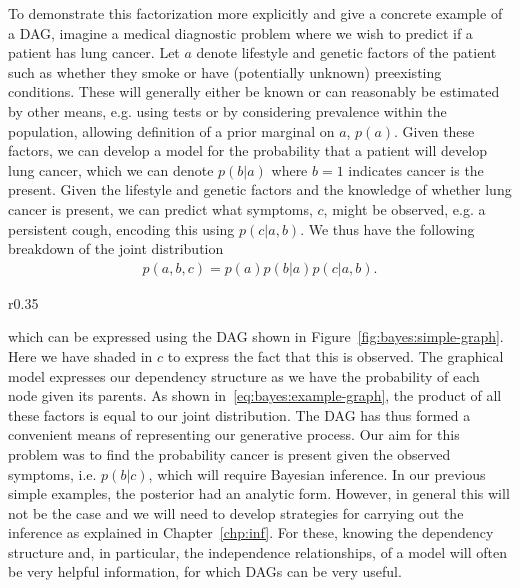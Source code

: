 To demonstrate this factorization more explicitly and give a concrete example of a DAG, 
imagine a medical diagnostic problem where we wish to predict if a patient has lung cancer.
Let $a$ denote lifestyle and genetic factors of the patient such as whether they smoke
or have (potentially unknown) preexisting conditions. 
These will generally either be known or can reasonably be estimated by other means, e.g. using 
tests or
by considering prevalence within the population, allowing definition of a prior marginal on $a$, $p(a)$.
Given these factors, we can develop a model for the probability that a patient will develop
lung cancer, which we can denote $p(b|a)$ where $b=1$ indicates cancer is the present.  Given the lifestyle and
genetic factors and the knowledge of whether lung cancer is present, we can predict what
symptoms, $c$, might be observed, e.g. a persistent cough, encoding this using $p(c|a,b)$.
We thus have the following breakdown of the joint distribution
\begin{align}
	\label{eq:bayes:example-graph}
	p(a,b,c) = p(a) p(b|a) p(c|a,b).
\end{align}
\begin{wrapfigure}{r}{0.35\textwidth}
	\vspace{-12pt}
	\centering 
	\resizebox{.32\textwidth}{!}{
		
	}
	\caption{Simple example DAG corresponding to~\eqref{eq:bayes:example-graph}
		\label{fig:bayes:simple-graph}}
	\vspace{-10pt}
\end{wrapfigure}
which can be expressed using
the DAG  shown in Figure~\ref{fig:bayes:simple-graph}. Here we have shaded in $c$ to express the fact that this is
observed.  The graphical model expresses our dependency structure as we have the probability
of each node given its parents.  As shown in~\eqref{eq:bayes:example-graph}, the product of
all these factors is equal to our joint distribution.  The DAG has thus formed a convenient means
of representing our generative process.
Our aim for this problem was to find the probability cancer is present given
the observed symptoms, i.e. $p(b|c)$, which will
require Bayesian inference.  In our previous simple examples, the posterior had an analytic form. 
However, in general this will not be the case and we will need to develop strategies for carrying
out the inference as explained in Chapter~\ref{chp:inf}.  For these, knowing the dependency
structure and, in particular, the independence relationships, of a model will often be very helpful
information, for which DAGs can be very useful.

